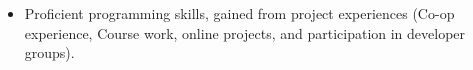 

\begin{cvparagraph} %
	\begin{itemize}
		\item Proficient programming skills, gained from project experiences (Co-op experience, Course work, online projects, and participation in developer groups).
	\end{itemize}
\end{cvparagraph}
